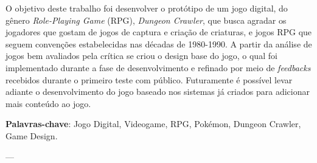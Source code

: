 \documentclass[
	12pt,				%
	openright,			%
	twoside,			%
	a4paper,			%
	english,			%
	french,				%
	spanish,			%
	brazil				%
	]{abntex2}
\newcommand{\listofquadrosname}{Lista de quadros}
\begin{document}

\setlength{\absparsep}{18pt} %
\begin{resumo}
O objetivo deste trabalho foi desenvolver o protótipo de um jogo digital, do gênero \emph{Role-Playing Game} (RPG), \emph{Dungeon Crawler}, que busca agradar os jogadores que gostam de jogos de captura e criação de criaturas, e jogos RPG que seguem convenções estabelecidas nas décadas de 1980-1990. A partir da análise de jogos bem avaliados pela crítica se criou o design base do jogo, o qual foi implementado durante a fase de desenvolvimento e refinado por meio de \emph{feedbacks} recebidos durante o primeiro teste com público. Futuramente é possível levar adiante o desenvolvimento do jogo baseado nos sistemas já criados para adicionar mais conteúdo ao jogo.


 \textbf{Palavras-chave}: Jogo Digital, Videogame, RPG, Pokémon, Dungeon Crawler, Game Design.
\end{resumo}


 


\listoffigures*
\cleardoublepage
 ---


\listoftables*
\cleardoublepage
\lstlistoflistings
\cleardoublepage

\end{document}
